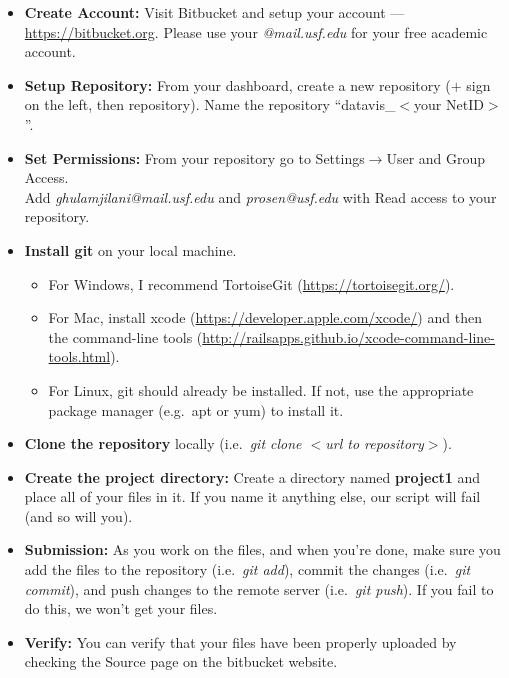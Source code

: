 \documentclass[a4paper,12pt]{article}
\begin{document}
\begin{itemize}
\item \textbf{Create Account:} Visit Bitbucket and setup your account  --- \url{https://bitbucket.org}. Please use your \textit{@mail.usf.edu} for your free academic account.

\item \textbf{Setup Repository:} From your dashboard, create a new repository ($+$ sign on the left, then repository).
 Name the repository ``datavis\_$<$your NetID$>$''.

\item \textbf{Set Permissions:}  From your repository go to Settings$\rightarrow$User and Group Access. \\
Add \textit{ghulamjilani@mail.usf.edu} and \textit{prosen@usf.edu} with Read access to your repository.

\item \textbf{Install git} on your local machine. 
\begin{itemize}
\item For Windows, I recommend TortoiseGit (\url{https://tortoisegit.org/}). 
\item For Mac, install xcode (\url{https://developer.apple.com/xcode/}) and then the command-line tools (\url{http://railsapps.github.io/xcode-command-line-tools.html}). 
\item For Linux, git should already be installed. If not, use the appropriate package manager (e.g.\ apt or yum) to install it.
\end{itemize}

\item \textbf{Clone the repository} locally (i.e.\ \textit{git clone $<$url to repository$>$}).

\item \textbf{Create the project directory:} Create a directory named \textbf{project1} and place all of your files in it. If you name it anything else, our script will fail (and so will you).

\item \textbf{Submission:} As you work on the files, and when you're done, make sure you add the files to the repository (i.e.\ \textit{git add}), commit the changes (i.e.\ \textit{git commit}), and push changes to the remote server (i.e.\ \textit{git push}). If you fail to do this, we won't get your files. 

\item \textbf{Verify:} You can verify that your files have been properly uploaded by checking the Source page on the bitbucket website.

\end{itemize}
\end{document}
